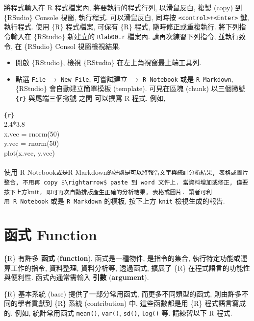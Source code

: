 \documentclass[
]{book}
\providecommand{\tightlist}{%
  \setlength{\itemsep}{0pt}\setlength{\parskip}{0pt}}
\begin{document}
將程式輸入在 R 程式檔案內,
將要執行的程式行列, 以滑鼠反白,
複製 (copy) 到 \{RSudio\} Console 視窗, 執行程式.
可以滑鼠反白, 同時按 \texttt{\textless{}control\textgreater{}+\textless{}Enter\textgreater{}} 鍵, 執行程式.
使用 \{R\} 程式檔案, 可保有 \{R\} 程式, 隨時修正或重複執行.
將下列指令輸入在 \{RStudio\} 新建立的 \texttt{Rlab00.r} 檔案內.
請再次練習下列指令, 並執行致令, 在 \{RSudio\} Consol 視窗檢視結果.

\begin{itemize}
\tightlist
\item
  開啟 \{RStudio\}, 檢視 \{RStudio\} 在左上角視窗最上端工具列.
\item
  點選 \texttt{File} \(\rightarrow\) \texttt{New\ File},
  可嘗試建立 \(\rightarrow\) \texttt{R\ Notebook} 或是 \texttt{R\ Markdown},
  \{RStudio\} 會自動建立簡單模板 (template).
  可見在區塊 (chunk) 以三個撇號 \texttt{\textasciigrave{}\textasciigrave{}\textasciigrave{}\{r\}}
  與尾端三個撇號 \texttt{\textasciigrave{}\textasciigrave{}\textasciigrave{}} 之間
  可以撰寫 R 程式. 例如,
\end{itemize}

\texttt{\textasciigrave{}\textasciigrave{}\textasciigrave{}\{r\}}~\\
2.4*3.8\\
x.vec = rnorm(50)\\
y.vec = rnorm(50)\\
plot(x.vec, y.vec)\\
\texttt{\textasciigrave{}\textasciigrave{}\textasciigrave{}}~\\
使用 R Notebook\texttt{或是}R Markdown\texttt{的好處是可以將報告文字與統計分析結果,\ 表格或圖片整合,\ 不用再\ copy\ \$\textbackslash{}rightarrow\$\ paste\ 到\ word\ 文件上.\ 當資料增加或修正,\ 僅要按下上方}knit\texttt{,\ 即可再次自動排版產生正確的分析結果,\ 表格或圖片.\ 讀者可利用\ R\ Notebook} 或是 \texttt{R\ Markdown} 的模板,
按下上方 \texttt{knit} 檢視生成的報告.

\hypertarget{ux51fdux5f0f-function}{%
\section{函式 Function}\label{ux51fdux5f0f-function}}

\{R\} 有許多
\textbf{函式}
(\textbf{function}),
函式是一種物件, 是指令的集合,
執行特定功能或運算工作的指令, 資料整理, 資料分析等,
透過函式,
擴展了 \{R\} 在程式語言的功能性與便利性.
函式內通常需輸入
\textbf{引數}
(\textbf{argument}).

\{R\} 基本系統 (base) 提供了一部分常用函式,
而更多不同類型的函式,
則由許多不同的學者貢獻到
\{R\} 系統 (contribution) 中,
這些函數都是用 \{R\} 程式語言寫成的.
例如, 統計常用函式
\texttt{mean()}, \texttt{var()}, \texttt{sd()}, \texttt{log()} 等.
請練習以下 R 程式.
\end{document}
